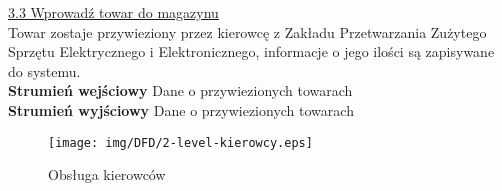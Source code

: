 	\underline{3.3 Wprowadź towar do magazynu}\\
	Towar zostaje przywieziony przez kierowcę z Zakładu Przetwarzania Zużytego Sprzętu Elektrycznego i Elektronicznego, informacje o jego ilości są zapisywane do systemu.\\
	\textbf{Strumień wejściowy} Dane o przywiezionych towarach\\
	\textbf{Strumień wyjściowy} Dane o przywiezionych towarach

	\begin{figure}[H]
		\centering
		\centerline{\texttt{[image: img/DFD/2-level-kierowcy.eps]}}
		\caption{Obsługa kierowców}
	\end{figure}
